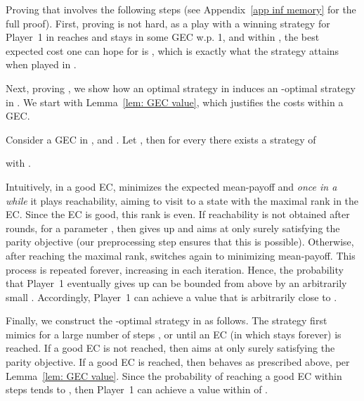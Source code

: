 \documentclass[runningheads,a4paper]{llncs}
\newcommand{\gec}{{GEC}\xspace}
\begin{document}
Proving that  involves the following steps (see Appendix~\ref{app inf memory} for the full proof).
First, proving  is not hard, as a play with a winning strategy  for Player~1 in  reaches and stays in some \gec  w.p. 1, and within , the best expected cost one can hope for is , which is exactly what the strategy  attains when played in .

Next, proving , we show how an optimal strategy  in  induces an -optimal strategy  in . We start with Lemma~\ref{lem: GEC value}, 
which 
justifies the 
costs within a \gec.
\begin{lemma}
\label{lem: GEC value}
Consider a \gec  in , and . Let , then for every  there exists a strategy  of

 with . 
\end{lemma}


Intuitively, in a good EC,  minimizes the expected mean-payoff and \emph{once in a while} it plays reachability, aiming to visit to a state with the maximal rank in the EC. Since the EC is good, this rank is even.
If reachability is not obtained after  rounds, for a parameter , then  gives up and aims at only surely satisfying the parity objective (our preprocessing step ensures that this is possible).
Otherwise, after reaching the maximal rank,  switches again to minimizing mean-payoff.
This process is repeated forever, increasing  in each iteration.
Hence, the probability that Player~1 eventually gives up can be bounded from above by an arbitrarily small . Accordingly, Player~1 can achieve a value that is arbitrarily close to .

Finally, we construct the -optimal strategy  in  as follows. 
The strategy  first mimics  for a large number of steps , or until an EC (in which  stays forever) is reached.
If a good EC is not reached, then  aims at only surely satisfying the parity objective. If a good EC is reached, then  behaves as prescribed above, per Lemma~\ref{lem: GEC value}. Since the probability of  reaching a good EC within  steps tends to , then Player~1 can achieve a value within  of .
\end{document}
